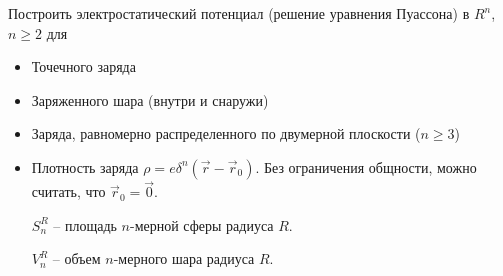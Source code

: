 \begin{tproblem}
  Построить электростатический потенциал (решение уравнения Пуассона)
  в $R^n$, $n≥2$ для
  \begin{itemize}
  \item Точечного заряда
  \item Заряженного шара (внутри и снаружи)
  \item Заряда, равномерно распределенного по двумерной плоскости ($n≥3$)
  \end{itemize}
\end{tproblem}
\begin{solution}
  \begin{itemize}
  \item Плотность заряда $ρ=eδ^n(\vec r -\vec r_0)$. Без ограничения
    общности, можно считать, что $\vec r_0 = \vec 0$.
    \begin{denote}
      $S_n^R$ -- площадь $n$-мерной сферы радиуса $R$.
    \end{denote}
    \begin{denote}
      $V_n^R$ -- объем $n$-мерного шара радиуса $R$.
    \end{denote}


\end{itemize}
\end{solution}
